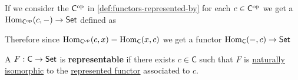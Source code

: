 \documentclass[../main.tex]{subfiles}
\begin{document}
\begin{remark}
  If we consider the  \(\mathsf{C}^{\operatorname*{op}}\) in \autoref{def:functors-represented-by} for each \(c \in \mathsf{C}^{\operatorname*{op}}\) we get a  \(\operatorname{Hom}_{\mathsf{C}^{\operatorname*{op}}}(c, -) \to \mathsf{Set}\) defined as
  \begin{center}
  \end{center}

  Therefore since \(\operatorname{Hom}_{\mathsf{C}^{\operatorname*{op}}}(c, x) = \operatorname{Hom}_{\mathsf{C}}(x, c)\) we get a functor \(\operatorname{Hom}_{\mathsf{C}}(-, c) \to \mathsf{Set}\)
  \begin{center}
  \end{center}
\end{remark}


\begin{definition}
  A  \(F: \mathsf{C} \to \mathsf{Set}\) is \textbf{representable} if there exists \(c \in \mathsf{C}\) such that \(F\) is \hyperref[def:natural-isomorphism]{naturally isomorphic} to the \hyperref[def:functors-represented-by]{represented functor} associated to \(c\).
\end{definition}



\begin{definition}[Limit] \label{def:categorical-limit}
\end{definition}

\begin{definition}[Colimit] \label{def:categorical-colimit}
\end{definition}

\begin{definition}[Equalizer] \label{def:equalizer}
\end{definition}
\end{document}
